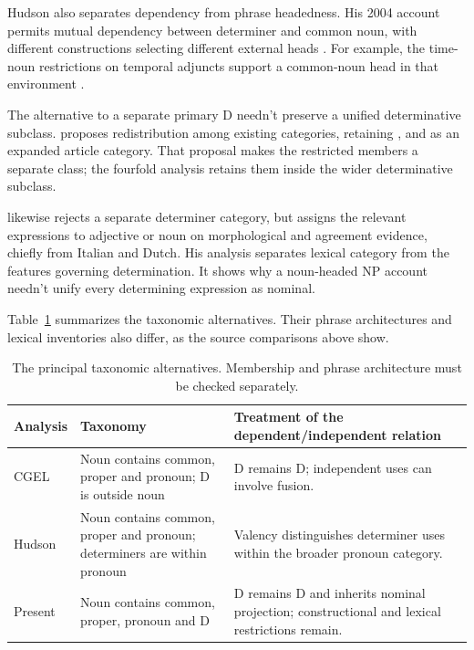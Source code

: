 \documentclass[12pt]{article}
\begin{document}
Hudson also separates dependency from phrase headedness. His 2004 account permits mutual dependency between determiner and common noun, with different constructions selecting different external heads \citep[7--9]{hudson2004determiners}. For example, the time-noun restrictions on temporal adjuncts support a common-noun head in that environment \citep[10--12]{hudson2004determiners}.

The alternative to a separate primary D needn't preserve a unified determinative subclass. \textcite{spinillo2004reconceptualising} proposes redistribution among existing categories, retaining ,  and  as an expanded article category. That proposal makes the restricted members a separate class; the fourfold analysis retains them inside the wider determinative subclass.

\textcite{vaneynde2003determiner} likewise rejects a separate determiner category, but assigns the relevant expressions to adjective or noun on morphological and agreement evidence, chiefly from Italian and Dutch. His analysis separates lexical category from the features governing determination. It shows why a noun-headed NP account needn't unify every determining expression as nominal.

Table~\ref{tab:rivals} summarizes the taxonomic alternatives. Their phrase architectures and lexical inventories also differ, as the source comparisons above show.

\begin{table}[tb]
\centering\small
\caption{The principal taxonomic alternatives. Membership and phrase architecture must be checked separately.}\label{tab:rivals}
\begin{tabular}{>{\raggedright\arraybackslash}p{2.1cm}>{\raggedright\arraybackslash}p{4.5cm}>{\raggedright\arraybackslash}p{5.1cm}}
\toprule
Analysis & Taxonomy & Treatment of the dependent/independent relation \\
\midrule
CGEL & Noun contains common, proper and pronoun; D is outside noun & D remains D; independent uses can involve fusion. \\
Hudson & Noun contains common, proper and pronoun; determiners are within pronoun & Valency distinguishes determiner uses within the broader pronoun category. \\
Present & Noun contains common, proper, pronoun and D & D remains D and inherits nominal projection; constructional and lexical restrictions remain. \\
\bottomrule
\end{tabular}
\end{table}
\end{document}
